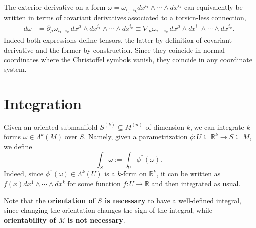 \documentclass[../geometry_main.tex]{subfiles}
\begin{document}
\begin{mytheorem}
The exterior derivative on a form $\omega=\omega_{i_1 \dots i_k} dx^{i_1} \wedge \cdots \wedge dx^{i_k}$ can equivalently be written in terms of covariant derivatives associated to a torsion-less connection,
\begin{align}
    d\omega &= \partial_\mu \omega_{i_1 \dots i_k} \, dx^{\mu} \wedge dx^{i_1} \wedge \cdots \wedge dx^{i_k}
    \equiv
    \nabla_\mu \omega_{i_1 \dots i_k} \, dx^{\mu} \wedge dx^{i_1} \wedge \cdots \wedge dx^{i_k}.
\end{align}
Indeed both expressions define tensors, the latter by definition of covariant derivative and the former by construction.
Since they coincide in normal coordinates where the Christoffel symbols vanish, they coincide in any coordinate system.
%
\end{mytheorem}



\section{Integration} 


\begin{mytheorem}
Given an oriented submanifold $S^{(k)} \subseteq M^{(n)}$ of dimension $k$, we can integrate $k$-forms $\omega \in \Lambda^k (M)$ over $S$.
Namely, given a parametrization $\phi: U \subseteq \mathbb{R}^k \to S \subseteq M$, we define
\begin{equation}
    \int_S \omega := \int_U \phi^* (\omega).
\end{equation}
Indeed, since $\phi^* (\omega) \in \Lambda^k (U)$ is a $k$-form on $\mathbb{R}^k$, it can be written as $f(x) dx^1 \wedge \cdots \wedge dx^k$ for some function $f: U \to \mathbb{R}$ and then integrated as usual.

Note that the \textbf{orientation of $S$ is necessary} to have a well-defined integral, since changing the orientation changes the sign of the integral, while \textbf{orientability of $M$ is not necessary}.
\end{mytheorem}
\end{document}
